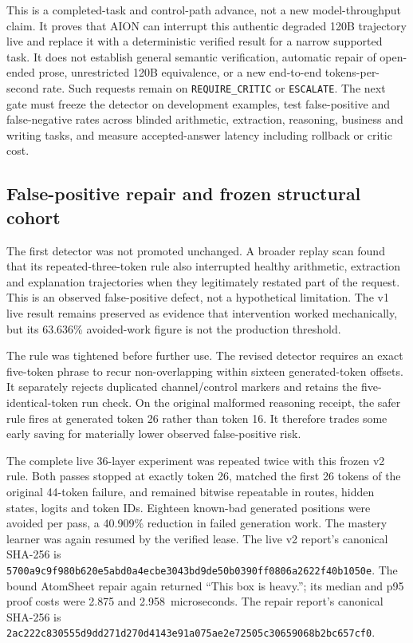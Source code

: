 This is a completed-task and control-path advance, not a new model-throughput
claim.  It proves that AION can interrupt this authentic degraded 120B
trajectory live and replace it with a deterministic verified result for a
narrow supported task.  It does not establish general semantic verification,
automatic repair of open-ended prose, unrestricted 120B equivalence, or a new
end-to-end tokens-per-second rate.  Such requests remain on
\texttt{REQUIRE\_CRITIC} or \texttt{ESCALATE}.  The next gate must freeze the
detector on development examples, test false-positive and false-negative rates
across blinded arithmetic, extraction, reasoning, business and writing tasks,
and measure accepted-answer latency including rollback or critic cost.

\subsection{False-positive repair and frozen structural cohort}

The first detector was not promoted unchanged.  A broader replay scan found
that its repeated-three-token rule also interrupted healthy arithmetic,
extraction and explanation trajectories when they legitimately restated part
of the request.  This is an observed false-positive defect, not a hypothetical
limitation.  The v1 live result remains preserved as evidence that intervention
worked mechanically, but its 63.636\% avoided-work figure is not the production
threshold.

The rule was tightened before further use.  The revised detector requires an
exact five-token phrase to recur non-overlapping within sixteen generated-token
offsets.  It separately rejects duplicated channel/control markers and retains
the five-identical-token run check.  On the original malformed reasoning
receipt, the safer rule fires at generated token 26 rather than token 16.  It
therefore trades some early saving for materially lower observed false-positive
risk.

The complete live 36-layer experiment was repeated twice with this frozen v2
rule.  Both passes stopped at exactly token 26, matched the first 26 tokens of
the original 44-token failure, and remained bitwise repeatable in routes,
hidden states, logits and token IDs.  Eighteen known-bad generated positions
were avoided per pass, a 40.909\% reduction in failed generation work.  The
mastery learner was again resumed by the verified lease.  The live v2 report's
canonical SHA-256 is
\texttt{5700a9c9f980b620e5abd0a4ecbe3043bd9de50b0390ff0806a2622f40b1050e}.
The bound AtomSheet repair again returned ``This box is heavy.''; its median
and p95 proof costs were 2.875 and 2.958~microseconds.  The repair report's
canonical SHA-256 is
\texttt{2ac222c830555d9dd271d270d4143e91a075ae2e72505c30659068b2bc657cf0}.

